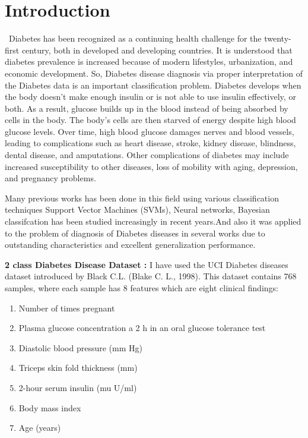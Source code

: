  
\pagestyle{empty} %

\titleGP %
\newpage

\section{Introduction}
   \    Diabetes has been recognized as a continuing health challenge for the twenty-first century, both in developed and developing countries. It is understood that diabetes prevalence is increased because of modern lifestyles, urbanization, and economic development.
   So, Diabetes disease diagnosis via proper interpretation of the Diabetes data is an important classification problem. 
Diabetes develops when the body doesn’t make enough insulin or is not able to use insulin effectively, or both. As a result, glucose builds up in the blood instead of being absorbed by cells in the body. The body’s cells are then starved of energy despite high blood glucose levels.
Over time, high blood glucose damages nerves and blood vessels, leading to complications such as heart disease, stroke, kidney disease, blindness, dental disease, and amputations. Other complications of diabetes may include increased susceptibility to other diseases, loss of mobility with aging, depression, and pregnancy problems.

Many previous works has been done in this field using various classification techniques Support Vector Machines (SVMs), Neural networks, Bayesian classifcation has been studied increasingly in recent years.And also it was applied to the problem of diagnosis of Diabetes diseases in several works due to outstanding characteristics and excellent generalization performance.
 
\textbf{2 class Diabetes Disease Dataset :}
I have used the UCI Diabetes diseases dataset introduced by Black C.L. (Blake C. L., 1998). This dataset contains 768 samples, where each sample has 8 features which are eight clinical findings:

\begin{enumerate}
  \item Number of times pregnant
 \item Plasma glucose concentration a 2 h in an oral glucose tolerance test
  \item Diastolic blood pressure (mm Hg)
  \item Triceps skin fold thickness (mm)
  \item 2-hour serum insulin (mu U/ml)
  \item Body mass index 
  \item Age (years)
\end{enumerate}

